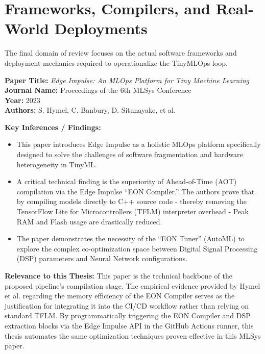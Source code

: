 \documentclass[11pt,a4paper,openany]{book}
\begin{document}
\section{Frameworks, Compilers, and Real-World Deployments}

The final domain of review focuses on the actual software frameworks and deployment mechanics required to operationalize the TinyMLOps loop.

\vspace{1.5em}
\noindent\textbf{Paper Title:} \textit{Edge Impulse: An MLOps Platform for Tiny Machine Learning} \cite{8}\\
\textbf{Journal Name:} Proceedings of the 6th MLSys Conference\\
\textbf{Year:} 2023\\
\textbf{Authors:} S. Hymel, C. Banbury, D. Situnayake, et al.

\vspace{0.5em}
\noindent\textbf{Key Inferences / Findings:}
\begin{itemize}
    \item This paper introduces Edge Impulse as a holistic MLOps platform specifically designed to solve the challenges of software fragmentation and hardware heterogeneity in TinyML.
    \item A critical technical finding is the superiority of Ahead-of-Time (AOT) compilation via the Edge Impulse ``EON Compiler.'' The authors prove that by compiling models directly to C++ source code - thereby removing the TensorFlow Lite for Microcontrollers (TFLM) interpreter overhead - Peak RAM and Flash usage are drastically reduced.
    \item The paper demonstrates the necessity of the ``EON Tuner'' (AutoML) to explore the complex co-optimization space between Digital Signal Processing (DSP) parameters and Neural Network configurations.
\end{itemize}

\vspace{0.5em}
\noindent\textbf{Relevance to this Thesis:} This paper is the technical backbone of the proposed pipeline's compilation stage. The empirical evidence provided by Hymel et al. regarding the memory efficiency of the EON Compiler serves as the justification for integrating it into the CI/CD workflow rather than relying on standard TFLM. By programmatically triggering the EON Compiler and DSP extraction blocks via the Edge Impulse API in the GitHub Actions runner, this thesis automates the same optimization techniques proven effective in this MLSys paper.
\end{document}
